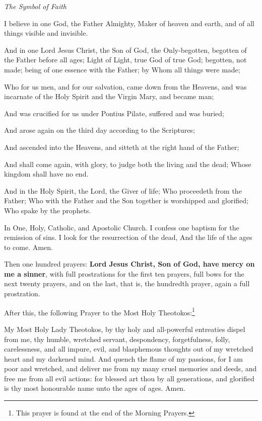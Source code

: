 \begin{center}
	\vspace{1cm}
	\textit{The Symbol of Faith}
\end{center}

\begin{hangparas}{.25in}{1}
I believe in one God, the Father Almighty, Maker of heaven and earth, and of all things visible and invisible.

And in one Lord Jesus Christ, the Son of God, the Only-begotten, begotten of the Father before all ages; Light of Light, true God of true God; begotten, not made; being of one essence with the Father; by Whom all things were made;

Who for us men, and for our salvation, came down from the Heavens, and was incarnate of the Holy Spirit and the Virgin Mary, and became man;

And was crucified for us under Pontius Pilate, suffered and was buried;

And arose again on the third day according to the Scriptures;

And ascended into the Heavens, and sitteth at the right hand of the Father;

And shall come again, with glory, to judge both the living and the dead; Whose kingdom shall have no end.

And in the Holy Spirit, the Lord, the Giver of life; Who proceedeth from the Father; Who with the Father and the Son together is worshipped and glorified; Who spake by the prophets.

In One, Holy, Catholic, and Apostolic Church. I confess one baptism for the remission of sins. I look for the resurrection of the dead, And the life of the ages to come. Amen.
\end{hangparas}

Then one hundred prayers: \textbf{Lord Jesus Christ, Son of God, have mercy on me a sinner}, with full prostrations for the first ten prayers, full bows for the next twenty prayers, and on the last, that is, the hundredth prayer, again a full prostration.

After this, the following Prayer to the Most Holy Theotokos:\footnote{This prayer is found at the end of the Morning Prayers.}

\begin{adjustwidth}{1cm}{1cm}
My Most Holy Lady Theotokos, by thy holy and all-powerful entreaties dispel from me, thy humble, wretched servant, despondency, forgetfulness, folly, carelessness, and all impure, evil, and blasphemous thoughts out of my wretched heart and my darkened mind. And quench the flame of my passions, for I am poor and wretched, and deliver me from my many cruel memories and deeds, and free me from all evil actions: for blessed art thou by all generations, and glorified is thy most honourable name unto the ages of ages. Amen.
\end{adjustwidth}

